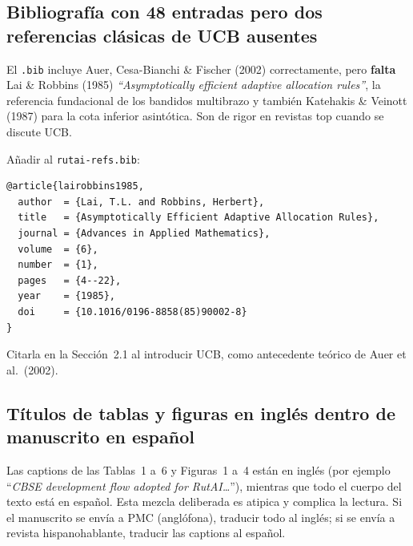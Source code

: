 \documentclass[11pt,a4paper]{article}
\begin{document}
\subsection{Bibliograf\'ia con 48 entradas pero dos referencias cl\'asicas de UCB ausentes}

\begin{deficiencia}[m.5 --- Deficiencia]
El \texttt{.bib} incluye Auer, Cesa-Bianchi \& Fischer (2002) correctamente, pero \textbf{falta} Lai \& Robbins (1985) \emph{``Asymptotically efficient adaptive allocation rules''}, la referencia fundacional de los bandidos multibrazo y tambi\'en Katehakis \& Veinott (1987) para la cota inferior asint\'otica. Son de rigor en revistas top cuando se discute UCB.
\end{deficiencia}

\begin{abordaje}
A\~nadir al \texttt{rutai-refs.bib}:

\begin{verbatim}
@article{lairobbins1985,
  author  = {Lai, T.L. and Robbins, Herbert},
  title   = {Asymptotically Efficient Adaptive Allocation Rules},
  journal = {Advances in Applied Mathematics},
  volume  = {6},
  number  = {1},
  pages   = {4--22},
  year    = {1985},
  doi     = {10.1016/0196-8858(85)90002-8}
}
\end{verbatim}

Citarla en la Secci\'on~2.1 al introducir UCB, como antecedente te\'orico de Auer et al.~(2002).
\end{abordaje}

\subsection{T\'itulos de tablas y figuras en ingl\'es dentro de manuscrito en espa\~nol}

\begin{deficiencia}[m.6 --- Deficiencia]
Las captions de las Tablas~1 a~6 y Figuras~1 a~4 est\'an en ingl\'es (por ejemplo ``\emph{CBSE development flow adopted for RutAI\ldots}''), mientras que todo el cuerpo del texto est\'a en espa\~nol. Esta mezcla deliberada es atipica y complica la lectura. Si el manuscrito se env\'ia a PMC (angl\'ofona), traducir todo al ingl\'es; si se env\'ia a revista hispanohablante, traducir las captions al espa\~nol.
\end{deficiencia}
\end{document}

